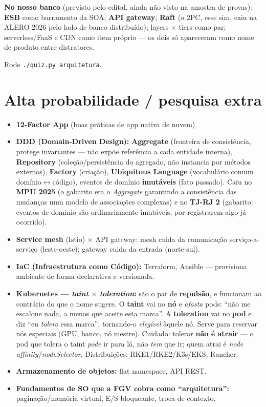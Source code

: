 \begin{jacaiu}
\textbf{No nosso banco} (previsto pelo edital, ainda não visto na amostra de
provas): \textbf{ESB} como barramento da SOA; \textbf{API gateway};
\textbf{Raft} (o 2PC, esse sim, caiu na ALERO 2026 pelo lado de banco
distribuído); layers $\times$ tiers como par; serverless/FaaS e CDN como item
próprio --- os dois só apareceram como nome de produto entre distratores.

Rode \texttt{./quiz.py arquitetura}.
\end{jacaiu}

\section{Alta probabilidade / pesquisa extra}

\begin{itemize}
\item \textbf{12-Factor App} (boas práticas de app nativa de nuvem).
\item \textbf{DDD (Domain-Driven Design):} \textbf{Aggregate} (fronteira de
consistência, protege invariantes --- não expõe referência a cada entidade
interna), \textbf{Repository} (coleção/persistência do agregado, não instancia
por métodos externos), \textbf{Factory} (criação), \textbf{Ubiquitous
Language} (vocabulário comum domínio$\leftrightarrow$código), eventos de
domínio \textbf{imutáveis} (fato passado). Caiu no \textbf{MPU 2025} (o
gabarito era o \emph{Aggregate} garantindo a consistência das mudanças num
modelo de associações complexas) e no \textbf{TJ-RJ 2} (gabarito: eventos de
domínio são ordinariamente imutáveis, por registrarem algo já ocorrido).
\item \textbf{Service mesh} (Istio) $\times$ API gateway: mesh cuida da
comunicação serviço-a-serviço (leste-oeste); gateway cuida da entrada
(norte-sul).
\item \textbf{IaC (Infraestrutura como Código):} Terraform, Ansible ---
provisiona ambiente de forma declarativa e versionada.
\item \textbf{Kubernetes --- \emph{taint} $\times$ \emph{toleration}:} são o
par de \textbf{repulsão}, e funcionam ao contrário do que o nome sugere. O
\textbf{taint} vai no \textbf{nó} e \emph{afasta} pods: ``não me escalone
nada, a menos que aceite esta marca''. A \textbf{toleration} vai no
\textbf{pod} e diz ``eu \emph{tolero} essa marca'', tornando-o \emph{elegível}
àquele nó. Serve para reservar nós especiais (GPU, banco, nó mestre). Cuidado:
tolerar \textbf{não é atrair} --- o pod que tolera o taint \emph{pode} ir para
lá, não \emph{tem} que ir; quem atrai é \emph{node affinity}/\emph{nodeSelector}.
Distribuições: RKE1/RKE2/K3s/EKS, Rancher.
\item \textbf{Armazenamento de objetos:} flat namespace, API REST.
\item \textbf{Fundamentos de SO que a FGV cobra como ``arquitetura'':}
paginação/memória virtual, E/S bloqueante, troca de contexto.
\end{itemize}

